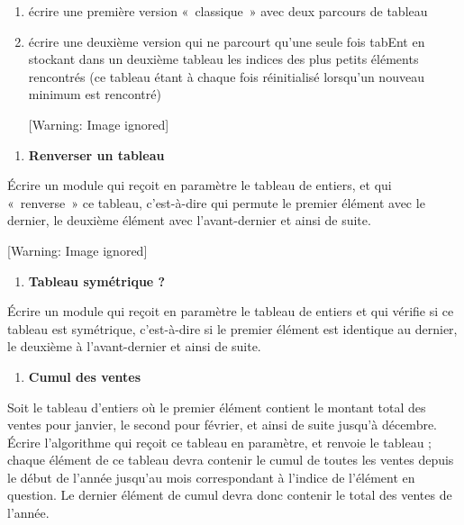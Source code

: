 \liststyleNumberingv
\begin{enumerate}
\item {
écrire une première version «~classique~» avec deux parcours de tableau}
\item {
écrire une deuxième version qui ne parcourt qu’une seule fois tabEnt en
stockant dans un deuxième tableau les indices des plus petits éléments
rencontrés (ce tableau étant à chaque fois réinitialisé lorsqu’un
nouveau minimum est rencontré)}
\begin{center}
 [Warning: Image ignored] %

\end{center}
\end{enumerate}
\liststyleExercice
\begin{enumerate}
\item {\sffamily\bfseries
Renverser un tableau}
\end{enumerate}
{
Écrire un module qui reçoit en paramètre le tableau
 de  entiers, et qui
«~renverse~» ce tableau, c’est-à-dire qui permute le premier élément
avec le dernier, le deuxième élément avec l’avant-dernier et ainsi de
suite.}

\begin{center}
 [Warning: Image ignored] %

\end{center}
\liststyleExercice
\setcounter{saveenum}{\value{enumi}}
\begin{enumerate}
\setcounter{enumi}{\value{saveenum}}
\item {\sffamily\bfseries
Tableau symétrique ?}
\end{enumerate}
{
Écrire un module qui reçoit en paramètre le tableau
 de  entiers et qui
vérifie si ce tableau est symétrique, c’est-à-dire si le premier
élément est identique au dernier, le deuxième à l’avant-dernier et
ainsi de suite.}

\liststyleExercice
\setcounter{saveenum}{\value{enumi}}
\begin{enumerate}
\setcounter{enumi}{\value{saveenum}}
\item {\sffamily\bfseries
Cumul des ventes}
\end{enumerate}
{
Soit le tableau  d’entiers où le
premier élément contient le montant total des ventes pour janvier, le
second pour février, et ainsi de suite jusqu'à
décembre. Écrire l’algorithme qui reçoit ce tableau en paramètre, et
renvoie le tableau  ; chaque élément
de ce tableau devra contenir le cumul de toutes les ventes depuis le
début de l’année jusqu’au mois correspondant à
l'indice de l’élément en question. Le dernier élément
de cumul devra donc contenir le total des ventes de l’année. }

